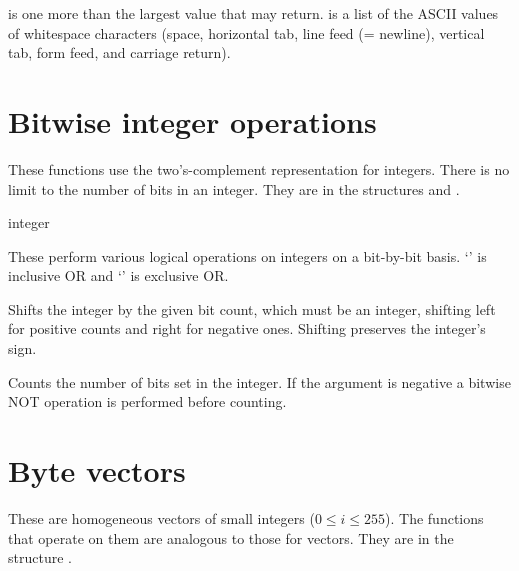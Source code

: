 \begin{protos}
\end{protos}
 is one more than the largest value that 
 may return.
 is a list of the ASCII values of whitespace characters
 (space, horizontal tab, line feed (= newline), vertical tab, form feed, and
 carriage return).

\section{Bitwise integer operations}

These functions use the two's-complement representation for integers.
There is no limit to the number of bits in an integer.
They are in the structures  and .

\begin{protos}
 {integer}
\end{protos}
\noindent
These perform various logical operations on integers on a bit-by-bit
basis. `' is inclusive OR and `' is exclusive OR.

\begin{protos}
\end{protos}
\noindent Shifts the integer by the given bit count, which must be an integer,
 shifting left for positive counts and right for negative ones.
Shifting preserves the integer's sign.

\begin{protos}
\end{protos}
\noindent Counts the number of bits set in the integer.
If the argument is negative a bitwise NOT operation is performed
 before counting.

\section{Byte vectors}

These are homogeneous vectors of small integers ($0 \le i \le 255$).
The functions that operate on them are analogous to those for vectors.
They are in the structure .

